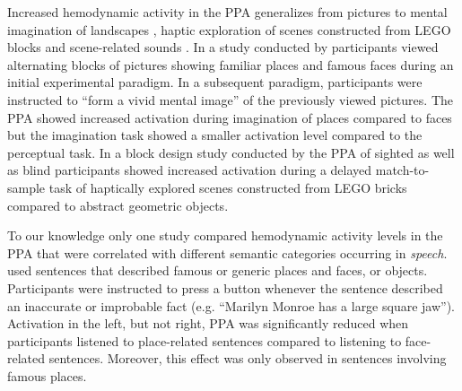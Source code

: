 \documentclass[english,11pt]{article}
\begin{document}
Increased hemodynamic activity in the PPA generalizes from pictures to mental
imagination of landscapes \citep{ocraven2000mental}, haptic exploration of
scenes constructed from LEGO blocks \citep{wolbers2011modality} and
scene-related sounds \citep{van2017development}.
In a study conducted by \citet{ocraven2000mental} participants viewed alternating
blocks of pictures showing familiar places and famous faces during an initial
experimental paradigm.
In a subsequent paradigm, participants were instructed to ``form a vivid mental
image'' of the previously viewed pictures.
The PPA showed increased activation during imagination of places compared to
faces but the imagination task showed a smaller activation level compared to
the perceptual task.
In a block design study conducted by \citet{wolbers2011modality} the PPA of
sighted as well as blind participants showed increased activation during a
delayed match-to-sample task of haptically explored scenes constructed from LEGO
bricks compared to abstract geometric objects.

To our knowledge only one study \citep{aziz2008modulation} compared hemodynamic
activity levels in the PPA that were correlated with different semantic
categories occurring in \textit{speech}.
\citet{aziz2008modulation} used sentences that described famous or generic places
and faces, or objects.
Participants were instructed to press a button whenever the sentence described
an inaccurate or improbable fact (e.g. ``Marilyn Monroe has a large square
jaw'').
Activation in the left, but not right, PPA was significantly reduced when
participants listened to place-related sentences compared to listening to
face-related sentences. Moreover, this effect was only observed in sentences
involving famous places.
\end{document}
